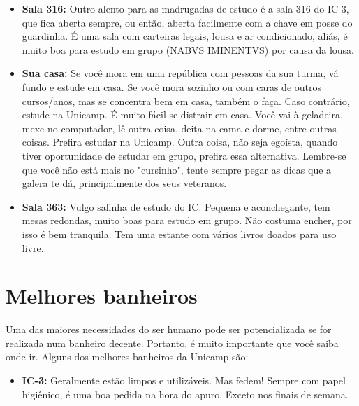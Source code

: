 \begin{itemize}
\item  \textbf{Sala 316:} Outro alento para as madrugadas de estudo é a sala 316 do IC-3, que fica aberta sempre, ou então, aberta facilmente com a chave em posse do guardinha. É uma sala com carteiras legais, lousa e ar condicionado, aliás, é muito boa para estudo em grupo (NABVS IMINENTVS) por causa da lousa.
\end{itemize}

\begin{itemize}
\item  \textbf{Sua casa:} Se você mora em uma república com pessoas da sua turma, vá fundo e estude em casa. Se você mora sozinho ou com caras de outros cursos/anos, mas se concentra bem em casa, também o faça. Caso contrário, estude na Unicamp. É muito fácil se distrair em casa. Você vai à geladeira, mexe no computador, lê outra coisa, deita na cama e dorme, entre outras coisas. Prefira estudar na Unicamp. Outra coisa, não seja egoísta, quando tiver oportunidade de estudar em grupo, prefira essa alternativa. Lembre-se que você não está mais no "cursinho", tente sempre pegar as dicas que a galera te dá, principalmente dos seus veteranos.
\end{itemize}

\begin{itemize}
\item  \textbf{Sala 363:} Vulgo salinha de estudo do IC. Pequena e aconchegante,
tem mesas redondas, muito boas para estudo em grupo. Não costuma encher, por isso
é bem tranquila. Tem uma estante com vários livros doados para uso livre.
\end{itemize}

\section{Melhores banheiros}

Uma das maiores necessidades do ser humano pode ser potencializada se for
realizada num banheiro decente. Portanto, é muito importante que você saiba onde
ir. Alguns dos melhores banheiros da Unicamp são:

\begin{itemize}
\item  \textbf{IC-3:} Geralmente estão limpos e utilizáveis. Mas fedem! Sempre com papel higiênico, é uma boa pedida na hora do apuro. Exceto nos finais de semana.
\end{itemize}

